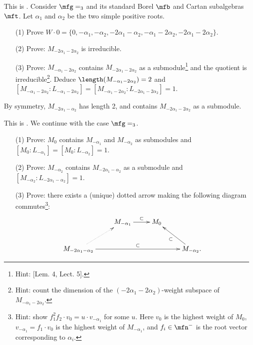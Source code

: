 	\begin{exe}
		This is . Consider $\mfg = \sl_3$ and its standard Borel $\mfb$ and Cartan subalgebras $\mft$. Let $\alpha_1$ and $\alpha_2$ be the two simple positive roots.
		\begin{itemize}
			\item[(1)]
				Prove $W\cdot 0 = \{ 0, -\alpha_1,-\alpha_2,-2\alpha_1-\alpha_2,-\alpha_1-2\alpha_2, -2\alpha_1-2\alpha_2 \}$.
			\item[(2)]
				Prove: $M_{-2\alpha_1-2\alpha_2}$ is irreducible.
			\item[(3)]
				Prove: $M_{-\alpha_1-2\alpha_2}$ contains $M_{-2\alpha_1-2\alpha_2}$ as a submodule\footnote{Hint: [Lem. 4, Lect. 5].} and the quotient is irreducible\footnote{Hint: count the dimension of the $(-2\alpha_1-2\alpha_2)$-weight subspace of $M_{-\alpha_1-2\alpha_2}$.}. Deduce $\length(M_{-\alpha_1-2\alpha_2})=2$ and $[M_{-\alpha_1-2\alpha_2}: L_{-\alpha_1-2\alpha_2}] = [M_{-\alpha_1-2\alpha_2}: L_{-2\alpha_1-2\alpha_2}] = 1$.
		\end{itemize}
	\end{exe}

	\begin{rem}
		By symmetry, $M_{-2\alpha_1-\alpha_2}$ has length 2, and contains $M_{-2\alpha_1-2\alpha_2}$ as a submodule.
	\end{rem}

	\begin{exe}
		This is . We continue with the case $\mfg = \sl_3$.
		\begin{itemize}
			\item[(1)]
				Prove: $M_0$ contains $M_{-\alpha_1}$ and $M_{-\alpha_2}$ as submodules and $[M_0: L_{-\alpha_1}]=[M_0: L_{-\alpha_2}]=1$.
			\item[(2)]
				Prove: $M_{-\alpha_2}$ contains $M_{-2\alpha_1-\alpha_2}$ as a submodule and $[M_{-\alpha_2}: L_{-2\alpha_1-\alpha_2}] = 1$.
			\item[(3)]
				Prove: there exists a (unique) dotted arrow making the following diagram commutes\footnote{Hint: show $f_1^2 f_2 \cdot v_0 = u \cdot v_{-\alpha_1}$ for some $u$. Here $v_0$ is the highest weight of $M_0$, $v_{-\alpha_1} = f_1 \cdot v_0$ is the highest weight of $M_{-\alpha_1}$, and $f_i\in \mfn^-$ is the root vector corresponding to $\alpha_i$.}:
				\[
					\xymatrix{
						& M_{-\alpha_1} \ar[r]^-\subset
						& M_0 \\
						M_{-2\alpha_1-\alpha_2} \ar[rrr]^-\subset \ar@{.>}[ru]
						& & & M_{-\alpha_2}. \ar[lu]^-\subset
					}
				\]
			
		\end{itemize}
	\end{exe}

